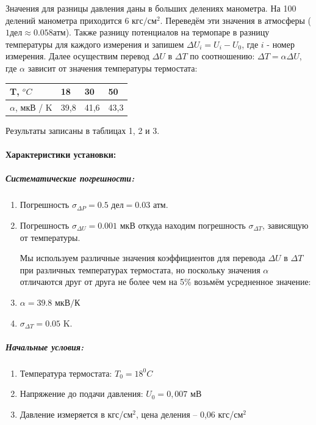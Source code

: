 \documentclass[a4paper,12pt]{article} %
\begin{document}
Значения для разницы давления даны в больших делениях манометра. На 100 делений манометра приходится 
6 $ \text{кгс} / \text{см}^2 $. Переведём эти значения в атмосферы ($ 1 \text{дел} \approx 0.058 \text{атм} $).
Также разницу потенциалов на термопаре в разницу температуры для каждого измерения и запишем 
 $ \Delta U_i = U_i - U_0 $, где $ i $ - номер измерения.
 Далее осуществим перевод $ \Delta U $ в $ \Delta T $ по соотношению: 
 $ \Delta T = \alpha \Delta U$,
 где $\alpha$ зависит от значения температуры термостата:
\begin{center} 
 \begin{tabular}{|l||l|l|l|}
 \hline 
 T, $^oC$ & 18 & 30 & 50 \\ 
 \hline 
 $\alpha$, мкВ / K & 39,8 & 41,6 & 43,3 \\ 
 \hline 
 \end{tabular}
\end{center} 
 Результаты записаны в таблицах 1, 2 и 3.

\paragraph{Характеристики установки:}
\subparagraph{Систематические погрешности:}
\begin{enumerate}
\itemsep0em
\item Погрешность $ \sigma_{\Delta P} = 0.5 \text{ дел} = 0.03 \text{ атм}$.
\item Погрешность $\sigma_{\Delta U} = 0.001 \text{ мкВ} $ откуда находим погрешность $\sigma_{\Delta T}$, зависящую от температуры.

 Мы используем различные значения коэффициентов для перевода $\Delta U$ в $\Delta T$ при различных температурах термостата, но поскольку значения $\alpha$ отличаются друг от друга не более чем на 5\% возьмём усредненное значение:
\item $\alpha = 39.8 \text{ мкВ/К}$
\item $\sigma_{\Delta T} = 0.05$ K.
\end{enumerate}
\subparagraph{Начальные условия:}
\begin{enumerate}
\itemsep0em
\item Температура термостата: $T_0 = 18^0 C$
\item Напряжение до подачи давления: $U_0 = 0,007$ мВ
\item Давление измеряется в кгс/см$^2$, цена деления -- 0,06 кгс/см$^2$
\end{enumerate}
\end{document}
